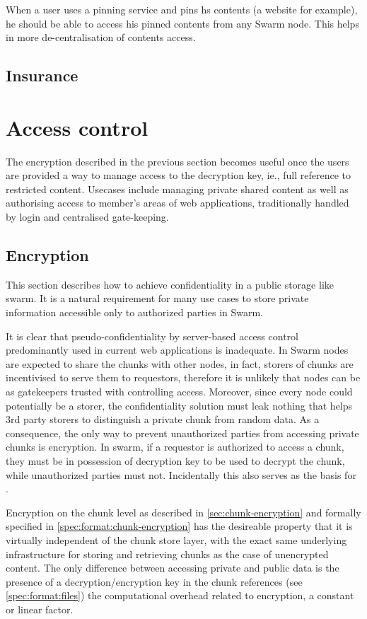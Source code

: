 When a user uses a pinning service and pins hs contents (a website for example), he should be able to access his pinned contents from any Swarm node. This helps in more de-centralisation of contents access.

\subsection{Insurance}\label{sec:insurance}


\section{Access control}\label{sec:access-control}

The encryption described in the previous section becomes useful once the users are provided a way to manage access to the decryption key, ie., full reference to restricted content.  
Usecases include managing private shared content as well as authorising access to member's areas of web applications, traditionally handled by login and centralised gate-keeping.

\subsection{Encryption}\label{sec:encryption}

This section describes how to achieve confidentiality in a  public storage like swarm. 
It is a natural requirement for many use cases to store private information accessible only to authorized parties in Swarm. 

It is clear that pseudo-confidentiality by server-based access  control predominantly used in current web applications is inadequate. In Swarm nodes are expected to share the chunks with other nodes, in fact, storers of chunks are  incentivised to serve them to requestors, therefore it is unlikely that nodes can be as gatekeepers trusted with controlling access. Moreover, since every node could potentially be a storer, the confidentiality solution must leak nothing that helps 3rd party storers to distinguish a private chunk from random data. As a consequence, the only way to prevent unauthorized parties from accessing private chunks is encryption. In swarm, if a requestor is authorized to access a chunk, they must be in possession of decryption key to be used to decrypt the chunk, while unauthorized parties must not. Incidentally this also serves as the basis for .

Encryption on the chunk level as described in \ref{sec:chunk-encryption} and formally specified in \ref{spec:format:chunk-encryption}
has the desireable property that it is virtually independent of the chunk store layer, with the exact same underlying infrastructure for storing and retrieving chunks as the case of unencrypted content.
The only difference between accessing private and public data is the presence of a decryption/encryption key in the chunk references (see \ref{spec:format:files}) the computational overhead related to encryption, a constant or linear factor.

